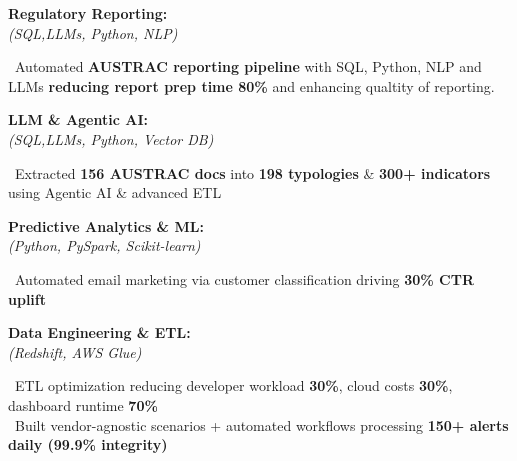 \documentclass[11pt,a4paper]{article}
\begin{document}
\begin{minipage}{\textwidth}
\begin{minipage}[t]{\textwidth-19pt}
\vspace{6pt}

\noindent\begin{minipage}[t]{0.28\textwidth}
\textbf{\color{headerblue}Regulatory Reporting:}\\[0pt]
\textit{(SQL,LLMs, Python, NLP)}
\end{minipage}%
\hfill%
\begin{minipage}[t]{0.68\textwidth}
\textbullet\ Automated \textbf{AUSTRAC reporting pipeline} with SQL, Python, NLP and LLMs \textbf{reducing report prep time 80\%} and enhancing qualtity of reporting.\\
\end{minipage}

\vspace{6pt}

\noindent\begin{minipage}[t]{0.28\textwidth}
\textbf{\color{headerblue}LLM \& Agentic AI:}\\[0pt]
\textit{(SQL,LLMs, Python, Vector DB)}
\end{minipage}%
\hfill%
\begin{minipage}[t]{0.68\textwidth}
\textbullet\ Extracted \textbf{156 AUSTRAC docs} into \textbf{198 typologies} \& \textbf{300+ indicators} using Agentic AI \& advanced ETL
\end{minipage}

\vspace{6pt}

\noindent\begin{minipage}[t]{0.28\textwidth}
\textbf{\color{headerblue}Predictive Analytics \& ML:}\\[0pt]
\textit{(Python, PySpark, Scikit-learn)}
\end{minipage}%
\hfill%
\begin{minipage}[t]{0.68\textwidth}
\textbullet\ Automated email marketing via customer classification driving \textbf{30\% CTR uplift}
\end{minipage}

\vspace{6pt}

\noindent\begin{minipage}[t]{0.28\textwidth}
\textbf{\color{headerblue}Data Engineering \& ETL:}\\[0pt]
\textit{(Redshift, AWS Glue)}
\end{minipage}%
\hfill%
\begin{minipage}[t]{0.68\textwidth}
\textbullet\ ETL optimization reducing developer workload \textbf{30\%}, cloud costs \textbf{30\%}, dashboard runtime \textbf{70\%}\\
\textbullet\ Built vendor-agnostic scenarios + automated workflows processing \textbf{150+ alerts daily (99.9\% integrity)}\\
\end{minipage}

\end{minipage}
\end{minipage}
\end{document}

